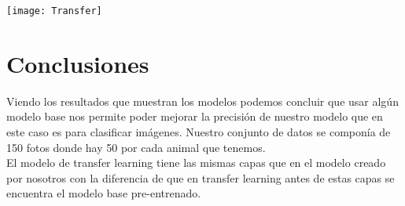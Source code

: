 \documentclass{article}
\begin{document}
	\texttt{[image: Transfer]} \\
	
	\section*{Conclusiones}
	
	Viendo los resultados que muestran los modelos podemos concluir que usar algún modelo base nos permite poder mejorar la precisión de nuestro modelo que en este caso es para clasificar imágenes. Nuestro conjunto de datos se componía de 150 fotos donde hay 50 por cada animal que tenemos. \\
	
	El modelo de transfer learning tiene las mismas capas que en el modelo creado por nosotros con la diferencia de que en transfer learning antes de estas capas se encuentra el modelo base pre-entrenado. \\
	
\end{document}

